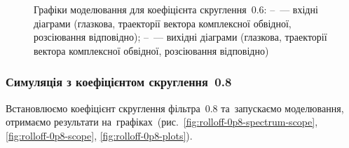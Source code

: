 \documentclass[
	a4paper,
	oneside,
	BCOR = 10mm,
	DIV = 12,
	12pt,
	headings = normal,
]{scrartcl}
\begin{document}
\begin{figure}[!htbp]
\begin{subfigure}{\textwidth / 3}
						\caption{}
						\label{subfig:rolloff-0p6-scatter-plot-out}
					\end{subfigure}%
					\caption{Графіки моделювання для коефіцієнта скруглення~$0.6$: –~— вхідні діаграми (глазкова, траекторії вектора комплексної обвідної, розсіювання відповідно); –~— вихідні діаграми (глазкова, траекторії вектора комплексної обвідної, розсіювання відповідно)}
					\label{fig:rolloff-0p6-plots}
				\end{figure}

			\clearpage
			\subsubsection{Симуляція з коефіцієнтом скруглення~0.8}
				Встановлюємо коефіцієнт скруглення фільтра~$0.8$ та~запускаємо моделювання, отримаємо результати на~графіках~(рис.~\ref{fig:rolloff-0p8-spectrum-scope}, \ref{fig:rolloff-0p8-scope}, \ref{fig:rolloff-0p8-plots}).
\end{document}
